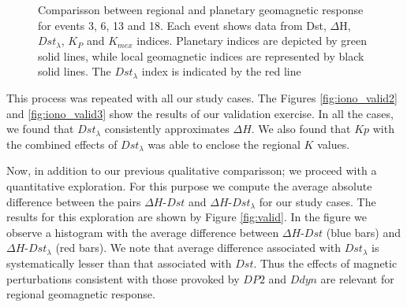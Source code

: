 \documentclass[a4paper,fleqn]{cas-dc}
\begin{document}
\begin{figure}[h!]
	\caption{Comparisson between regional and planetary geomagnetic response for events 3, 6, 13 and 18. Each event shows data from Dst, $\Delta$H, ${Dst_\lambda}$, ${K_P}$ and ${K_{mex}}$ indices. Planetary indices are depicted by green solid lines, while local geomagnetic indices are represented by black solid lines. The $Dst_\lambda$ index is indicated by the red line}
	\label{fig:iono_valid}
\end{figure}


This process was repeated with all our study cases. The Figures \ref{fig:iono_valid2} and \ref{fig:iono_valid3} show the results of our validation exercise. In all the cases, we found that $Dst_\lambda$ consistently approximates $\Delta H$. We also found that $Kp$ with the combined effects of $Dst_\lambda$ was able to enclose the regional $K$ values.

Now, in addition to our previous qualitative comparisson; we proceed with a quantitative exploration. For this purpose we compute the average absolute difference between the pairs $\Delta H$-$Dst$ and $\Delta H$-$Dst_\lambda$ for our study cases. The results for this exploration are shown by Figure \ref{fig:valid}. In the figure we observe a histogram with the average difference between $\Delta H$-$Dst$ (blue bars) and $\Delta H$-$Dst_\lambda$ (red bars). We note that average difference associated with $Dst_\lambda$ is systematically lesser than that associated with $Dst$. Thus the effects of magnetic perturbations consistent with those provoked by $DP2$ and $Ddyn$ are relevant for regional geomagnetic response.


\end{document}
